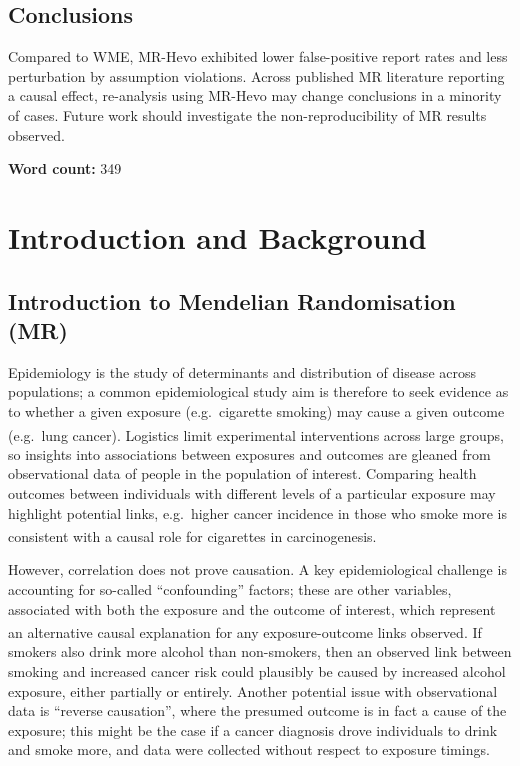 \documentclass[
]{article}
\begin{document}
\subsection{Conclusions}\label{conclusions}

Compared to WME, MR-Hevo exhibited lower false-positive report rates and less perturbation by assumption violations. Across published MR literature reporting a causal effect, re-analysis using MR-Hevo may change conclusions in a minority of cases. Future work should investigate the non-reproducibility of MR results observed.

\textbf{Word count:} 349

\newpage

\section{Introduction and Background}\label{introduction-and-background}

\subsection{Introduction to Mendelian Randomisation (MR)}\label{introduction-to-mendelian-randomisation-mr}

Epidemiology is the study of determinants and distribution of disease across populations; a common epidemiological study aim is therefore to seek evidence as to whether a given exposure (e.g.~cigarette smoking) may cause a given outcome (e.g.~lung cancer)\textsuperscript{}. Logistics limit experimental interventions across large groups, so insights into associations between exposures and outcomes are gleaned from observational data of people in the population of interest. Comparing health outcomes between individuals with different levels of a particular exposure may highlight potential links, e.g.~higher cancer incidence in those who smoke more is consistent with a causal role for cigarettes in carcinogenesis\textsuperscript{}.

However, correlation does not prove causation. A key epidemiological challenge is accounting for so-called ``confounding'' factors; these are other variables, associated with both the exposure and the outcome of interest, which represent an alternative causal explanation for any exposure-outcome links observed\textsuperscript{}. If smokers also drink more alcohol than non-smokers, then an observed link between smoking and increased cancer risk could plausibly be caused by increased alcohol exposure, either partially or entirely. Another potential issue with observational data is ``reverse causation'', where the presumed outcome is in fact a cause of the exposure; this might be the case if a cancer diagnosis drove individuals to drink and smoke more, and data were collected without respect to exposure timings.
\end{document}
